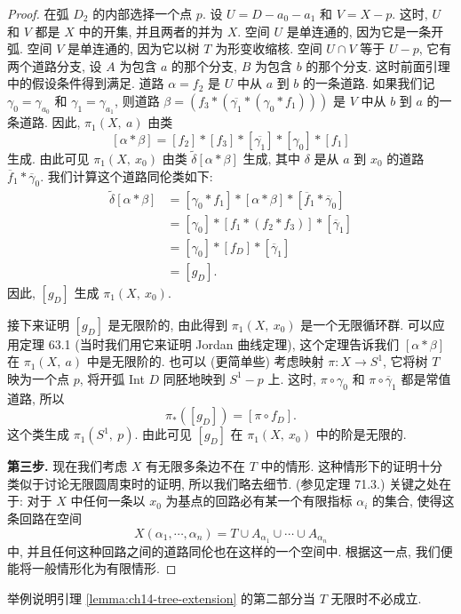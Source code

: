 \begin{proof}
在弧 $D_{2}$ 的内部选择一个点 $p$. 设 $U=D-a_{0}-a_{1}$ 和 $V=X-p$. 这时, $U$ 和 $V$ 都是 $X$ 中的开集, 并且两者的并为 $X$. 空间 $U$ 是单连通的, 因为它是一条开弧. 空间 $V$ 是单连通的, 因为它以树 $T$ 为形变收缩核. 空间 $U\cap V$ 等于 $U-p$, 它有两个道路分支, 设 $A$ 为包含 $a$ 的那个分支, $B$ 为包含 $b$ 的那个分支. 这时前面引理中的假设条件得到满足. 道路 $\alpha=f_{2}$ 是 $U$ 中从 $a$ 到 $b$ 的一条道路. 如果我们记 $\gamma_{0}=\gamma_{a_{0}}$ 和 $\gamma_{1}=\gamma_{a_{1}}$, 则道路 $\beta=(f_{3}*(\overline{\gamma_{1}}*(\gamma_{0}*f_{1})))$ 是 $V$ 中从 $b$ 到 $a$ 的一条道路. 因此, $\pi_{1}(X,\ a)$ 由类
\[
[\alpha*\beta]=[f_{2}]*[f_{3}]*[\overline{\gamma_{1}}]*[\gamma_{0}]*[f_{1}]
\]
生成. 由此可见 $\pi_{1}(X,\ x_{0})$ 由类 $\widetilde{\delta}[\alpha*\beta]$ 生成, 其中 $\delta$ 是从 $a$ 到 $x_{0}$ 的道路 $\overline{f}_{1}*\overline{\gamma}_{0}$. 我们计算这个道路同伦类如下:
\[
\begin{aligned}
\widetilde{\delta}[\alpha*\beta]&=[\gamma_{0}*f_{1}]*[\alpha*\beta]*[\overline{f}_{1}*\overline{\gamma}_{0}]\\
&=[\gamma_{0}]*[f_{1}*(f_{2}*f_{3})]*[\overline{\gamma}_{1}]\\
&=[\gamma_{0}]*[f_{D}]*[\overline{\gamma}_{1}]\\
&=[g_{D}].
\end{aligned}
\]
因此, $[g_{D}]$ 生成 $\pi_{1}(X,\ x_{0})$.

接下来证明 $[g_{D}]$ 是无限阶的, 由此得到 $\pi_{1}(X,\ x_{0})$ 是一个无限循环群. 可以应用定理 63.1 (当时我们用它来证明 Jordan 曲线定理), 这个定理告诉我们 $[\alpha*\beta]$ 在 $\pi_{1}(X,\ a)$ 中是无限阶的. 也可以 (更简单些) 考虑映射 $\pi\colon X\to S^{1}$, 它将树 $T$ 映为一个点 $p$, 将开弧 Int $D$ 同胚地映到 $S^{1}-p$ 上. 这时, $\pi\circ\gamma_{0}$ 和 $\pi\circ\overline{\gamma}_{1}$ 都是常值道路, 所以
\[
\pi_{*}([g_{D}])=[\pi\circ f_{D}].
\]
这个类生成 $\pi_{1}(S^{1},\ p)$. 由此可见 $[g_{D}]$ 在 $\pi_{1}(X,\ x_{0})$ 中的阶是无限的.

\textbf{第三步.} 现在我们考虑 $X$ 有无限多条边不在 $T$ 中的情形. 这种情形下的证明十分类似于讨论无限圆周束时的证明, 所以我们略去细节. (参见定理 71.3.) 关键之处在于: 对于 $X$ 中任何一条以 $x_{0}$ 为基点的回路必有某一个有限指标 $\alpha_{i}$ 的集合, 使得这条回路在空间
\[
X(\alpha_{1},\cdots,\alpha_{n})=T\cup A_{\alpha_{1}}\cup\cdots\cup A_{\alpha_{n}}
\]
中, 并且任何这种回路之间的道路同伦也在这样的一个空间中. 根据这一点, 我们便能将一般情形化为有限情形.
\end{proof}

\begin{exercise}
\label{exercise:ch14-sec84-01}
举例说明引理 \cref{lemma:ch14-tree-extension} 的第二部分当 $T$ 无限时不必成立.
\end{exercise}

